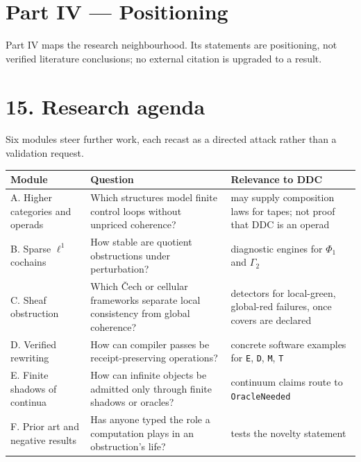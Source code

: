 \documentclass[
  11pt,
]{article}
\renewcommand{\_}{\ddcunderscore\allowbreak}
\begin{document}
\section{Part IV --- Positioning}\label{part-iv-positioning}

Part IV maps the research neighbourhood. Its statements are positioning,
not verified literature conclusions; no external citation is upgraded to
a result.

\section{15. Research agenda}\label{research-agenda}

Six modules steer further work, each recast as a directed attack rather
than a validation request.

\begin{longtable}[]{@{}
  >{\raggedright\arraybackslash}p{}
  >{\raggedright\arraybackslash}p{}
  >{\raggedright\arraybackslash}p{}@{}}
\toprule\noalign{}
\begin{minipage}[b]{\linewidth}\raggedright
Module
\end{minipage} & \begin{minipage}[b]{\linewidth}\raggedright
Question
\end{minipage} & \begin{minipage}[b]{\linewidth}\raggedright
Relevance to DDC
\end{minipage} \\
\midrule\noalign{}
\endhead
\bottomrule\noalign{}
\endlastfoot
A. Higher categories and operads & Which structures model finite control
loops without unpriced coherence? & may supply composition laws for
tapes; not proof that DDC is an operad \\
B. Sparse \(\ell^1\) cochains & How stable are quotient obstructions
under perturbation? & diagnostic engines for \(\Phi_1\) and
\(\Gamma_2\) \\
C. Sheaf obstruction & Which Čech or cellular frameworks separate local
consistency from global coherence? & detectors for local-green,
global-red failures, once covers are declared \\
D. Verified rewriting & How can compiler passes be receipt-preserving
operations? & concrete software examples for \texttt{E}, \texttt{D},
\texttt{M}, \texttt{T} \\
E. Finite shadows of continua & How can infinite objects be admitted
only through finite shadows or oracles? & continuum claims route to
\texttt{Oracle\allowbreak Needed} \\
F. Prior art and negative results & Has anyone typed the role a
computation plays in an obstruction's life? & tests the novelty
statement \\
\end{longtable}
\end{document}
